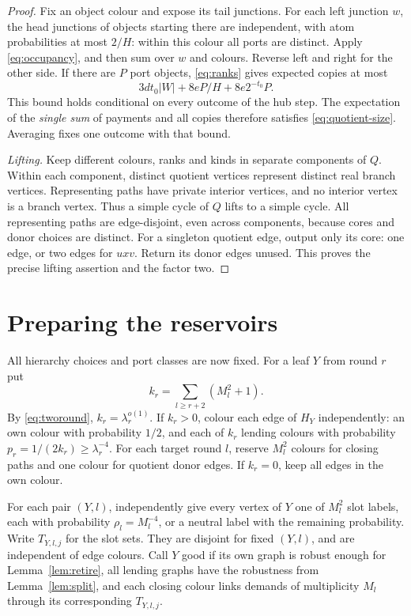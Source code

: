 \documentclass[11pt]{article}
\theoremstyle{remark}\newtheorem*{remark}{Remark}
\begin{document}
\begin{proof}
Fix an object colour and expose its tail junctions. For each left
junction $w$, the head junctions of objects starting there are
independent, with atom probabilities at most $2/H$: within this colour
all ports are distinct. Apply \eqref{eq:occupancy}, and then sum over
$w$ and colours. Reverse left and right for the other side.
If there are $P$ port objects, \eqref{eq:ranks} gives expected copies at most
\[
 3dt_0|W|+8eP/H+8e2^{-t_0}P.
\]
This bound holds conditional on every outcome of the hub step.
The expectation of the \emph{single sum} of payments and all copies
therefore satisfies \eqref{eq:quotient-size}. Averaging fixes one outcome
with that bound.

\emph{Lifting.}
Keep different colours, ranks and kinds in separate components of $Q$.
Within each component, distinct quotient vertices represent distinct real
branch vertices. Representing paths have private interior vertices, and
no interior vertex is a branch vertex.
Thus a simple cycle of $Q$ lifts to a simple cycle. All representing
paths are edge-disjoint, even across components, because cores and
donor choices are distinct. For a singleton quotient edge, output only
its core: one edge, or two edges for $uxv$. Return its donor edges
unused. This proves the precise lifting assertion and the factor two.
\end{proof}

\section{Preparing the reservoirs}
All hierarchy choices and port classes are now fixed.
For a leaf $Y$ from round $r$ put
\[
 k_r=\sum_{l\ge r+2}(M_l^2+1).
\]
By \eqref{eq:tworound}, $k_r=\lambda_r^{o(1)}$. If $k_r>0$, colour
each edge of $H_Y$ independently: an own colour with probability
$1/2$, and each of $k_r$ lending colours with probability
$p_r=1/(2k_r)\ge\lambda_r^{-4}$.
For each target round $l$, reserve $M_l^2$ colours for closing paths
and one colour for quotient donor edges. If $k_r=0$, keep all edges
in the own colour.

For each pair $(Y,l)$, independently give every vertex of $Y$ one of
$M_l^2$ slot labels, each with probability $\rho_l=M_l^{-4}$, or a
neutral label with the remaining probability. Write $T_{Y,l,j}$ for
the slot sets. They are disjoint for fixed $(Y,l)$, and are independent
of edge colours. Call $Y$ good if its own graph is robust enough for
Lemma~\ref{lem:retire}, all lending graphs have the robustness from
Lemma~\ref{lem:split}, and each closing colour links demands of
multiplicity $M_l$ through its corresponding $T_{Y,l,j}$.
\end{document}
